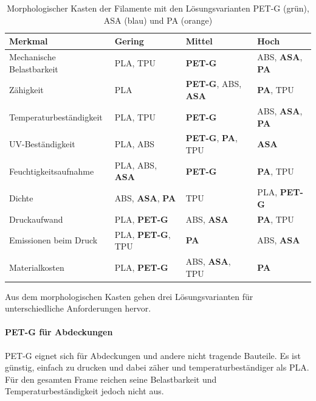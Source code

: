         \begin{table}[H]
            \centering
            \caption{Morphologischer Kasten der Filamente mit den Lösungsvarianten PET-G (grün), ASA (blau) und PA (orange)}
            \label{tab:Morph_Kasten}
            \newcommand{\vPETG}{\textcolor[HTML]{00795A}{\textbf{PET-G}}}
            \newcommand{\vASA}{\textcolor[HTML]{0072B2}{\textbf{ASA}}}
            \newcommand{\vPA}{\textcolor[HTML]{C2510A}{\textbf{PA}}}
            \renewcommand{\arraystretch}{1.3} %
            \begin{tabularx}{\textwidth}{l X X X}
                \toprule
                \textbf{Merkmal}            & \textbf{Gering}       & \textbf{Mittel}       & \textbf{Hoch} \\
                \midrule
                Mechanische Belastbarkeit   & PLA, TPU              & \vPETG                & ABS, \vASA, \vPA \\
                Zähigkeit                   & PLA                   & \vPETG, ABS, \vASA    & \vPA, TPU \\
                Temperaturbeständigkeit     & PLA, TPU              & \vPETG                & ABS, \vASA, \vPA \\
                UV-Beständigkeit            & PLA, ABS              & \vPETG, \vPA, TPU     & \vASA \\
                Feuchtigkeitsaufnahme       & PLA, ABS, \vASA       & \vPETG                & \vPA, TPU \\
                Dichte                      & ABS, \vASA, \vPA      & TPU                   & PLA, \vPETG \\
                Druckaufwand                & PLA, \vPETG           & ABS, \vASA            & \vPA, TPU \\
                Emissionen beim Druck       & PLA, \vPETG, TPU      & \vPA                  & ABS, \vASA \\
                Materialkosten              & PLA, \vPETG           & ABS, \vASA, TPU       & \vPA \\
                \bottomrule
            \end{tabularx}
        \end{table}

        Aus dem morphologischen Kasten gehen drei Lösungsvarianten für unterschiedliche Anforderungen hervor.

        \paragraph{PET-G für Abdeckungen}
        PET-G eignet sich für Abdeckungen und andere nicht tragende Bauteile. Es ist günstig, einfach zu drucken und dabei zäher und temperaturbeständiger als PLA. Für den gesamten Frame reichen seine Belastbarkeit und Temperaturbeständigkeit jedoch nicht aus.

